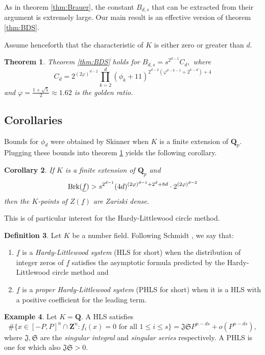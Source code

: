 \documentclass[12pt]{amsart}
\let\ul\underline
\newtheorem{theorem}{Theorem}[section]
\newtheorem{corollary}[theorem]{Corollary}
\theoremstyle{definition}
\newtheorem{definition}[theorem]{Definition}
\newtheorem{example}[theorem]{Example}
\newcommand{\Z}{\mathbf{Z}}
\newcommand{\Q}{\mathbf{Q}}
\newcommand{\brk}{\textnormal{Brk}}
\let\ul\underline
\begin{document}
As in theorem \ref{thm:Brauer}, the constant $B_{d,s}$ that can be extracted from their argument is extremely large. Our main result is an effective version of theorem \ref{thm:BDS}.

Assume henceforth that the characteristic of $K$ is either zero or greater than $d.$

\begin{theorem}\label{thm:main}
Theorem \ref{thm:BDS} holds for $B_{d,s} = s^{2^{d-1}}C_d,$ where
\[
C_d = 2^{(2\varphi)^{d-2}} \prod_{k=2}^d (\phi_k+11)^{2^{d-2}(\varphi^{d-k-1}+2^{k-d})+4}
\]
and $\varphi = \frac{1+\sqrt{5}}{2}\approx 1.62$ is the golden ratio.    
\end{theorem}


\subsection{Corollaries} Bounds for $\phi_d$ were obtained by Skinner \cite{Skinner-phi} when $K$ is a finite extension of $\Q_p.$ Plugging these bounds into theorem \ref{thm:main} yields the following corollary. 

\begin{corollary}\label{cor:p-adic} 
If $K$ is a finite extension of $\Q_p$ and 
\[
\brk(\ul{f}) > s^{2^{d-1}} (4d)^{(2\varphi)^{d-1}+2^d+8d}  \cdot 2^{(2\varphi)^{d-2}} 
\]
then the $K$-points of $Z(\ul{f})$ are Zariski dense. 
\end{corollary}


This is of particular interest for the Hardy-Littlewood circle method.

\begin{definition}
    Let $K$ be a number field. Following Schmidt \cite{Schmidt}, we say that:
    \begin{enumerate}
        \item $\underline{f}$ is a \emph{Hardy-Littlewood system} (HLS for short) when the distribution of  integer zeros of $\ul{f}$ satisfies the asymptotic formula predicted by the Hardy-Littlewood circle method and 
        \item $\ul{f}$ is a \emph{proper Hardy-Littlewood system} (PHLS for short) when it is a HLS with a positive coefficient for the leading term.
    \end{enumerate}  
\end{definition}

\begin{example}
    Let $K= \Q.$ A HLS satisfies
    \[
    \#\{x\in [-P, P]^n\cap \Z^n: f_i(x) = 0\text{ for all }1\leq i\leq s\} = \mathfrak J\mathfrak S P^{n-ds} + o(P^{n-ds}),
    \]
    where $\mathfrak{J},\mathfrak{S}$ are the \textit{singular integral} and \textit{singular series} respectively. A PHLS is one for which also $\mathfrak J\mathfrak S >0.$ 
\end{example}
\end{document}
